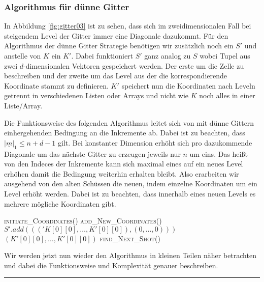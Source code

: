 \documentclass[a4paper,12pt]{llncs}
\numberwithin{equation}{section}
\begin{document}
\subsubsection{Algorithmus für dünne Gitter}

In Abbildung \ref{fig:gitter03} ist zu sehen, dass sich im zweidimensionalen Fall bei steigendem Level der Gitter immer eine Diagonale dazukommt. Für den Algorithmus der dünne Gitter Strategie benötigen wir zusätzlich noch ein $S'$ und anstelle von $K$ ein $K'$. Dabei funktioniert $S'$ ganz analog zu $S$ wobei Tupel aus zwei $d$-dimensionalen Vektoren gespeichert werden. Der erste um die Zelle zu beschreiben und der zweite um das Level aus der die korrespondierende Koordinate stammt zu definieren. $K'$ speichert nun die Koordinaten nach Leveln getrennt in verschiedenen Listen oder Arrays und nicht wie $K$ noch alles in einer Liste/Array.

Die Funktionsweise des folgenden Algorithmus leitet sich von mit dünne Gittern einhergehenden Bedingung an die Inkremente ab. Dabei ist zu beachten, dass $|\underline{m}|_1\leq n+d-1$ gilt. Bei konstanter Dimension erhöht sich pro dazukommende Diagonale um das nächste Gitter zu erzeugen jeweils nur $n$ um eins. Das heißt von den Indeces der Inkremente kann sich maximal eines auf ein neues Level erhöhen damit die Bedingung weiterhin erhalten bleibt. Also erarbeiten wir ausgehend von den alten Schüssen  die neuen, indem einzelne Koordinaten um ein Level erhöht werden. Dabei ist zu beachten, dass innerhalb eines neuen Levels es mehrere mögliche Koordinaten gibt. 


\begin{tcolorbox}
	\begin{algorithmic}
		\State \textsc{initiate\_Coordinates}()
		\EndIf
		\State \textsc{add\_New\_Coordinates}()
		\EndIf
		\State $S'.add((('K[0][0],\dots,K'[0][0]),(0,\dots,0)))$
		\State \Return $(K'[0][0],\dots,K'[0][0])$
		\Else
		\State \textsc{find\_Next\_Shot}()
		\EndIf
		\EndFunction
	\end{algorithmic}
\end{tcolorbox}

Wir werden jetzt nun wieder den Algorithmus in kleinen Teilen näher betrachten und dabei die Funktionsweise und Komplexität genauer beschreiben.

\smallskip
\hrule
\smallskip
\end{document}
